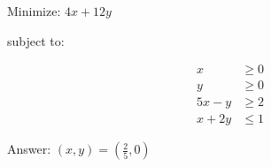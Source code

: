 \documentclass{article}
\begin{document}
\hrulefill
\begin{multicols}{2}

    Minimize: \(4x + 12 y\)

    subject to:

    \begin{align*}
        x & \geq 0\\
        y & \geq 0\\
        5 x - y &\geq 2\\
        x + 2y &\leq 1
    \end{align*}
    

    \columnbreak

    Answer: \( (x, y) = \left(\frac{2}{5}, 0\right) \)

\end{multicols}
\end{document}
